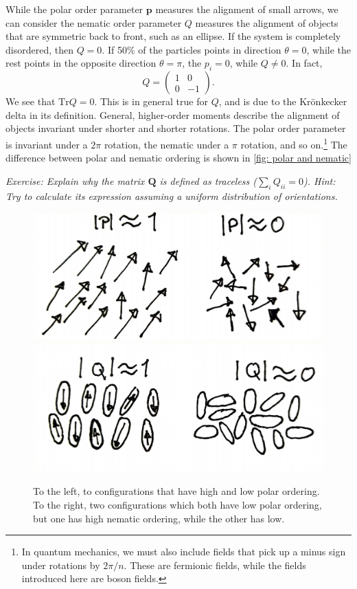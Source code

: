 While the polar order parameter $\bm p$ measures the alignment of small arrows, we can consider the nematic order parameter $Q$ measures the alignment of objects that are symmetric back to front, such as an ellipse.
If the system is completely disordered, then $Q = 0$.
If 50\% of the particles points in direction $\theta = 0$, while the rest points in the opposite direction $\theta = \pi$, the $p_i = 0$, while $Q\neq 0$.
In fact, 
%
\begin{equation}
    Q = 
    \begin{pmatrix}
        1 & 0 \\ 0 & -1
    \end{pmatrix}.
\end{equation}
%
We see that $\mathrm{Tr} Q = 0$.
This is in general true for $Q$, and is due to the Krönkecker delta in its definition.
General, higher-order moments describe the alignment of objects invariant under shorter and shorter rotations.
The polar order parameter is invariant under a $2 \pi$ rotation, the nematic under a $\pi$ rotation, and so on.\footnote{
    In quantum mechanics, we must also include fields that pick up a minus sign under rotations by $2 \pi / n$.
    These are fermionic fields, while the fields introduced here are boson fields.
}
The difference between polar and nematic ordering is shown in \autoref{fig: polar and nematic}

{\it Exercise: Explain why the matrix $\bm Q$ is defined as traceless (${\sum}_i Q_{ii} = 0$). Hint: Try to calculate its expression assuming a uniform distribution of orientations.}


\begin{figure}[!htb]
    \centering
    \includegraphics[width=.38\textwidth]{chapters/Figures/scalar/polar.pdf}
    \hspace{1cm}
    \includegraphics[width=.4\textwidth]{chapters/Figures/scalar/nematic.pdf}
    \caption{
        To the left, to configurations that have high and low polar ordering.
    To the right, two configurations which both have low polar ordering, but one has high nematic ordering, while the other has low.}
    \label{fig: polar and nematic}
\end{figure}

